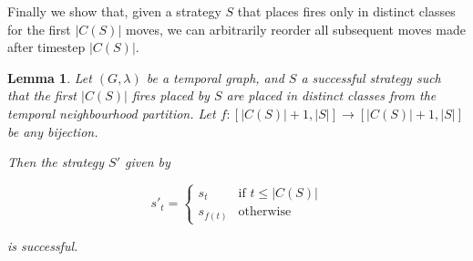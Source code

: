 \documentclass[preprint,12pt]{elsarticle}
\newtheorem{lemma}{Lemma}
\begin{document}
Finally we show that, given a strategy $S$ that places fires only in distinct classes for the first $|C(S)|$ moves, we can arbitrarily reorder all subsequent moves made after timestep $|C(S)|$.
\begin{lemma}
    \label{lem:arbord1}
    Let $(G, \lambda)$ be a temporal graph, and $S$ a successful strategy such that the first $|C(S)|$ fires placed by $S$ are placed in distinct classes from the temporal neighbourhood partition. Let $f : [|C(S)|+1,|S|] \to [|C(S)|+1,|S|]$ be any bijection.

   Then the strategy $S'$ given by

    \[s'_t=\begin{cases}
        s_t&\text{if }t\leq|C(S)|\\
        s_{f(t)}&\text{otherwise}
    \end{cases}\]

    is successful.
\end{lemma}
\end{document}
